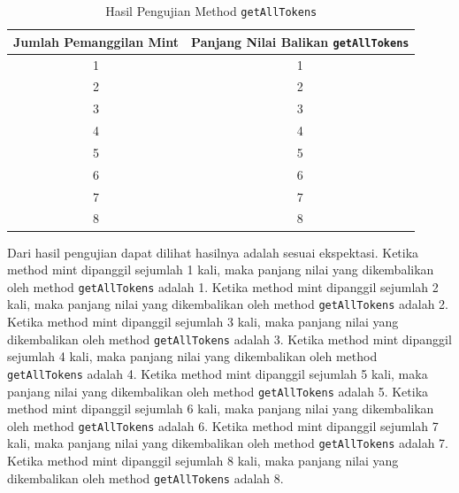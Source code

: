 \begin{longtable}{|c|c|}
  \caption{Hasil Pengujian Method \texttt{getAllTokens}}
  \label{tb:UjiGetAllTokens}                                                              \\
  \hline
  \rowcolor[HTML]{C0C0C0}
  \textbf{Jumlah Pemanggilan Mint} & \textbf{Panjang Nilai Balikan \texttt{getAllTokens}} \\
  \hline
  1                                & 1                                                    \\
  2                                & 2                                                    \\
  3                                & 3                                                    \\
  4                                & 4                                                    \\
  5                                & 5                                                    \\
  6                                & 6                                                    \\
  7                                & 7                                                    \\
  8                                & 8                                                    \\
  \hline
\end{longtable}

Dari hasil pengujian dapat dilihat hasilnya adalah sesuai ekspektasi.
Ketika method mint dipanggil sejumlah 1 kali, maka panjang nilai yang dikembalikan oleh method \texttt{getAllTokens} adalah
1. Ketika method mint dipanggil sejumlah 2 kali, maka panjang nilai yang dikembalikan oleh method \texttt{getAllTokens} adalah
2. Ketika method mint dipanggil sejumlah 3 kali, maka panjang nilai yang dikembalikan oleh method \texttt{getAllTokens} adalah
3. Ketika method mint dipanggil sejumlah 4 kali, maka panjang nilai yang dikembalikan oleh method \texttt{getAllTokens} adalah
4. Ketika method mint dipanggil sejumlah 5 kali, maka panjang nilai yang dikembalikan oleh method \texttt{getAllTokens} adalah
5. Ketika method mint dipanggil sejumlah 6 kali, maka panjang nilai yang dikembalikan oleh method \texttt{getAllTokens} adalah
6. Ketika method mint dipanggil sejumlah 7 kali, maka panjang nilai yang dikembalikan oleh method \texttt{getAllTokens} adalah
7. Ketika method mint dipanggil sejumlah 8 kali, maka panjang nilai yang dikembalikan oleh method \texttt{getAllTokens} adalah
8.

